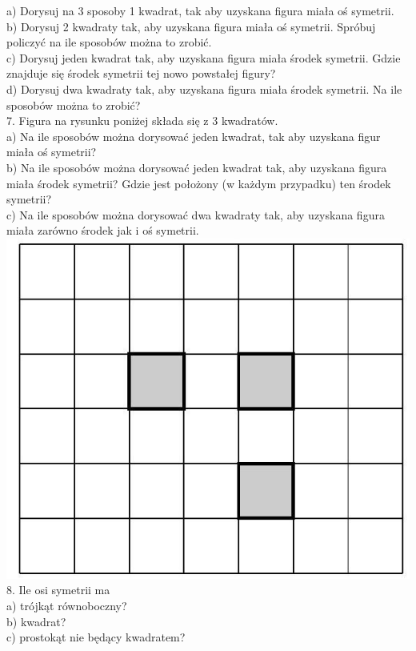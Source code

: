 \documentclass[10pt]{article}
\begin{document}
a) Dorysuj na 3 sposoby 1 kwadrat, tak aby uzyskana figura miała oś symetrii.\\
b) Dorysuj 2 kwadraty tak, aby uzyskana figura miała oś symetrii. Spróbuj policzyć na ile sposobów można to zrobić.\\
c) Dorysuj jeden kwadrat tak, aby uzyskana figura miała środek symetrii. Gdzie znajduje się środek symetrii tej nowo powstałej figury?\\
d) Dorysuj dwa kwadraty tak, aby uzyskana figura miała środek symetrii. Na ile sposobów można to zrobić?\\
7. Figura na rysunku poniżej składa się z 3 kwadratów.\\
a) Na ile sposobów można dorysować jeden kwadrat, tak aby uzyskana figur miała oś symetrii?\\
b) Na ile sposobów można dorysować jeden kwadrat tak, aby uzyskana figura miała środek symetrii? Gdzie jest położony (w każdym przypadku) ten środek symetrii?\\
c) Na ile sposobów można dorysować dwa kwadraty tak, aby uzyskana figura miała zarówno środek jak i oś symetrii.\\
\includegraphics[max width=\textwidth, center]{2024_11_21_e9b4faa005d5be2cc318g-156}\\
8. Ile osi symetrii ma\\
a) trójkąt równoboczny?\\
b) kwadrat?\\
c) prostokąt nie będący kwadratem?\\
\end{document}

